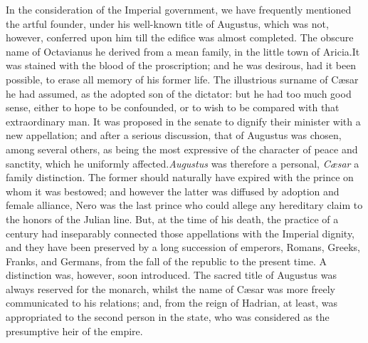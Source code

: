 In the consideration of the Imperial government, we have
frequently mentioned the artful founder, under his well-known
title of Augustus, which was not, however, conferred upon him
till the edifice was almost completed. The obscure name of
Octavianus he derived from a mean family, in the little town of
Aricia.\footnotemark[241] It was stained with the blood of the proscription;
and he was desirous, had it been possible, to erase all memory of
his former life. The illustrious surname of Cæsar he had assumed,
as the adopted son of the dictator: but he had too much good
sense, either to hope to be confounded, or to wish to be compared
with that extraordinary man. It was proposed in the senate to
dignify their minister with a new appellation; and after a
serious discussion, that of Augustus was chosen, among several
others, as being the most expressive of the character of peace
and sanctity, which he uniformly affected.\footnotemark[25] \textit{Augustus} was
therefore a personal, \textit{Cæsar} a family distinction. The former
should naturally have expired with the prince on whom it was
bestowed; and however the latter was diffused by adoption and
female alliance, Nero was the last prince who could allege any
hereditary claim to the honors of the Julian line. But, at the
time of his death, the practice of a century had inseparably
connected those appellations with the Imperial dignity, and they
have been preserved by a long succession of emperors, Romans,
Greeks, Franks, and Germans, from the fall of the republic to the
present time. A distinction was, however, soon introduced. The
sacred title of Augustus was always reserved for the monarch,
whilst the name of Cæsar was more freely communicated to his
relations; and, from the reign of Hadrian, at least, was
appropriated to the second person in the state, who was
considered as the presumptive heir of the empire.\footnotemark[251]


